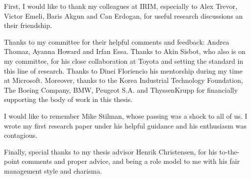 \begin{acknowledgements}

First, I would like to thank my colleagues at IRIM, especially to Alex Trevor, Victor Emeli, Baris Akgun and Can Erdogan, for useful research discussions an their friendship.

Thanks to my committee for their helpful comments and feedback: Andrea Thomaz, Ayanna Howard and Irfan Essa. Thanks to Akin Sisbot, who also is on my committee, for his close collaboration at Toyota and setting the standard in this line of research. Thanks to Dinei Floriencio his mentorship during my time at Microsoft. Moreover, thanks to the Korea Industrial Technology Foundation, The Boeing Company, BMW, Peugeot S.A. and ThyssenKrupp for financially supporting the body of work in this thesis.

I would like to remember Mike Stilman, whose passing was a shock to all of us. I wrote my first research paper under his helpful guidance and his enthusiasm was contagious.

Finally, special thanks to my thesis advisor Henrik Christensen, for his to-the-point comments and proper advice, and being a role model to me with his fair management style and charisma.

\end{acknowledgements}